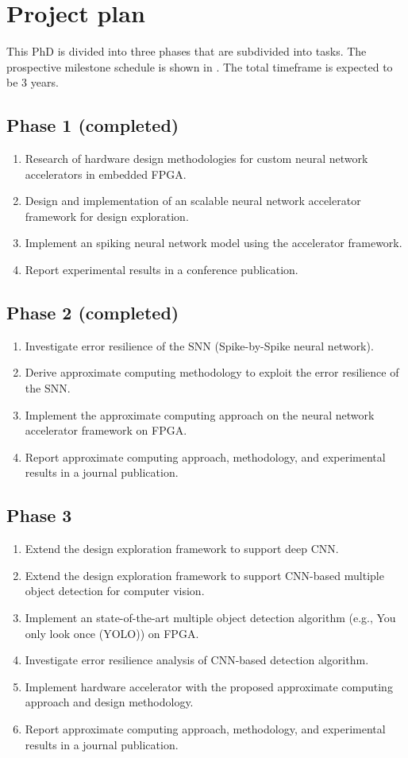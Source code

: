 \section{Project plan}
This PhD is divided into three phases that are subdivided into tasks. The prospective milestone schedule is shown in . The total timeframe is expected to be 3 years.

\subsection{Phase 1 (completed)}
\begin{enumerate}
\item Research of hardware design methodologies for custom neural network accelerators in embedded FPGA.
\item Design and implementation of an scalable neural network accelerator framework for design exploration.
\item Implement an spiking neural network model using the accelerator framework.
\item Report experimental results in a conference publication.
\end{enumerate}

\subsection{Phase 2 (completed)}
\begin{enumerate}
	\item Investigate error resilience of the SNN (Spike-by-Spike neural network).
	\item Derive approximate computing methodology to exploit the error resilience of the SNN.
	\item Implement the approximate computing approach on the neural network accelerator framework on FPGA.
	\item Report approximate computing approach, methodology, and experimental results in a journal publication.
\end{enumerate}

\subsection{Phase 3}
\begin{enumerate}
	\item Extend the design exploration framework to support deep CNN.
	\item Extend the design exploration framework to support CNN-based multiple object detection for computer vision.
	\item Implement an state-of-the-art multiple object detection algorithm (e.g., You only look once (YOLO)) on FPGA.
	\item Investigate error resilience analysis of CNN-based detection algorithm.
	\item Implement hardware accelerator with the proposed approximate computing approach and design methodology.
	\item Report approximate computing approach, methodology, and experimental results in a journal publication.
\end{enumerate}

